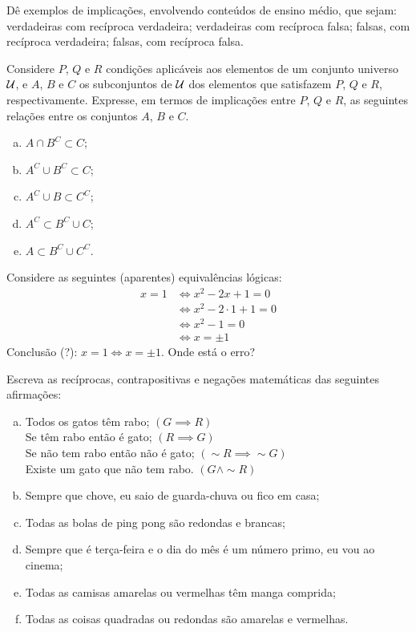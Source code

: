 \begin{exercise}
Dê exemplos de implicações, envolvendo conteúdos de ensino
  médio, que sejam: verdadeiras com recíproca verdadeira;
  verdadeiras com recíproca falsa; falsas, com recíproca verdadeira;
  falsas, com recíproca falsa.
\end{exercise}

\begin{exercise}
Considere $P$, $Q$ e $R$ condições aplicáveis aos elementos
de um conjunto universo $\mathcal{U}$, e $A$, $B$ e $C$ os subconjuntos de
$\mathcal{U}$ dos elementos que satisfazem $P$, $Q$ e $R$, respectivamente.
Expresse, em termos de implicações entre $P$, $Q$ e $R$, as
seguintes relações entre os conjuntos $A$, $B$ e $C$.
\begin{enumerate}[a.]
\item $A \cap B^C \subset C$;
\item $A^C \cup B^C \subset C$;
\item $A^C \cup B \subset C^C$;
\item $A^C \subset B^C \cup C$;
\item $A \subset B^C \cup C^C$.
\end{enumerate}
\end{exercise}

\begin{exercise}
Considere as seguintes (aparentes) equivalências lógicas:
\begin{align*}
x=1 & \iff x^2 -2x +1 = 0 \\
& \iff x^2 -2 \cdot 1 +1 =0 \\
& \iff x^2 - 1 =0 \\
& \iff x = \pm 1
\end{align*}
Conclusão (?): $x=1 \iff x= \pm 1$. Onde está o erro?
\end{exercise}

\begin{exercise}
Escreva as recíprocas, contrapositivas e negações
matemáticas das seguintes afirmações:
\begin{enumerate}[a.]
  \item Todos os gatos têm rabo; $\left(G \implies R \right)$\\
   Se têm rabo então é gato; $\left(R \implies G \right)$\\
   Se não tem rabo então não é gato; $\left(\sim R \implies \sim G \right)$\\
   Existe um gato que não tem rabo. $\left(G \land \sim R \right)$
  \item Sempre que chove, eu saio de guarda-chuva ou fico em casa;
  \item Todas as bolas de ping pong são redondas e brancas;
  \item Sempre que é terça-feira e o dia do mês é um número primo,
  eu vou ao cinema;
  \item Todas as camisas amarelas ou vermelhas têm manga comprida;
  \item Todas as coisas quadradas ou redondas são amarelas e
  vermelhas.
\end{enumerate}
\end{exercise}

